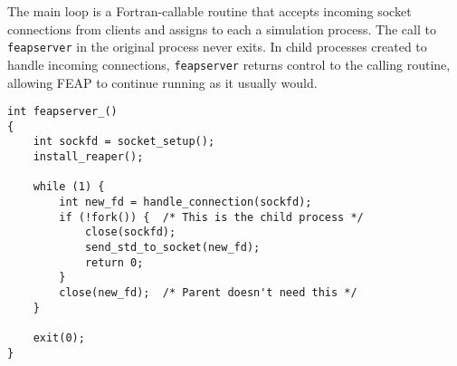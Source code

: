 The main loop is a Fortran-callable routine that accepts incoming
socket connections from clients and assigns to each a simulation
process.  The call to {\tt feapserver} in the original process
never exits.  In child processes created to handle incoming
connections, {\tt feapserver} returns control to the calling routine,
allowing FEAP to continue running as it usually would.

\begin{verbatim}
int feapserver_()
{
    int sockfd = socket_setup();
    install_reaper();

    while (1) {
        int new_fd = handle_connection(sockfd);
        if (!fork()) {  /* This is the child process */
            close(sockfd);
            send_std_to_socket(new_fd);
            return 0;
        }
        close(new_fd);  /* Parent doesn't need this */
    }

    exit(0);
}

\end{verbatim}
